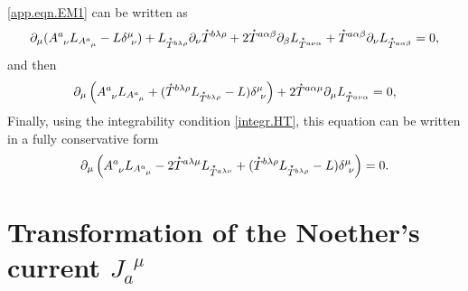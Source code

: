 \documentclass[
10pt, %
a4paper, %
oneside, %
headinclude,footinclude, %
BCOR5mm, %
]{scrartcl}
\newcommand{\pd}[1]{\partial_{#1}}
\newcommand{\tetr}[2]{A^{#1}_{\phantom{#1}#2}}
\newcommand{\Laghodge}{L}%
\newcommand{\HDT}[1]{\accentset{\star}{T}^{#1}}
\newcommand{\NC}[2]{J^{\phantom{#1}#2}_{#1}}
\begin{document}
\eqref{app.eqn.EM1} can be written as
\begin{equation}
\pd{\mu}(\tetr{a}{\nu}\Laghodge_{\tetr{a}{\mu}} - L \delta^\mu_{\ \nu}) +
\Laghodge_{\HDT{b\lambda\rho}}\pd{\nu}\HDT{b\lambda\rho} +
2\HDT{a\alpha\beta}\pd{\beta}\Laghodge_{\HDT{a\nu\alpha}} + 
\HDT{a\alpha\beta}\pd{\nu}\Laghodge_{\HDT{a\alpha\beta}} = 0,
\end{equation} 
and then
\begin{equation}
\pd{\mu}\left(\tetr{a}{\nu}\Laghodge_{\tetr{a}{\mu}} + 
(\HDT{b\lambda\rho}\Laghodge_{\HDT{b\lambda\rho}}- 
L) \delta^\mu_{\ \nu} \right) +
2\HDT{a\alpha\mu}\pd{\mu}\Laghodge_{\HDT{a\nu\alpha}} = 0,
\end{equation} 
Finally, using the integrability condition \eqref{integr.HT}, this equation can be written in a 
fully conservative form
\begin{equation}
\pd{\mu}\left(\tetr{a}{\nu}\Laghodge_{\tetr{a}{\mu}} -
2\HDT{a\lambda\mu}\Laghodge_{\HDT{a\lambda\nu}}
+
(\HDT{b\lambda\rho}\Laghodge_{\HDT{b\lambda\rho}}- 
L) \delta^\mu_{\ \nu} \right) = 0.
\end{equation} 




\section{Transformation of the Noether's current $ \NC{a}{\mu} $}\label{app.sec.NC}
\end{document}
